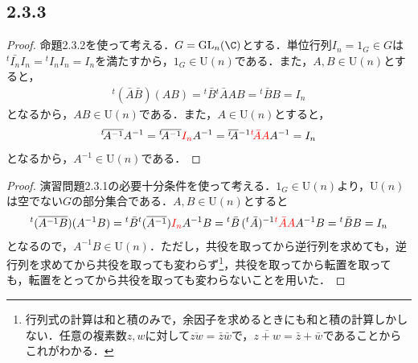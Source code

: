 \documentclass[uplatex,dvipdfmx,a4paper,11pt]{jsarticle}
\newenvironment{tleftbar}{\begin{tbleftline}\setlength{\parindent}{1zw}}{\end{tbleftline}}
\begin{document}
\subsection*{2.3.3}
\begin{tleftbar}
    \begin{proof}
        命題2.3.2を使って考える．$G=\mathrm{GL}_{n}(\C)$とする．単位行列$I_n=1_G\in G$は${}^t\bar{I_n}I_n={}^tI_nI_n=I_n$を満たすから，$1_G\in \mathrm{U}(n)$である．また，$A,B\in \mathrm{U}(n)$とすると，
        \begin{align*}
            {}^t(\bar{A}\bar{B})(AB)={}^t\bar{B}{}^t\!\bar{A}AB={}^t\bar{B}B=I_n
        \end{align*}
        となるから，$AB\in \mathrm{U}(n)$である．また，$A\in \mathrm{U}(n)$とすると，
        \begin{align*}
            {}^t\!\overline{A^{-1}}A^{-1}={}^t\!\overline{A^{-1}}\textcolor{red}{I_n}A^{-1}=\overline{{}^t\!A}{}^{-1}\textcolor{red}{{}^t\!\bar{A}A}A^{-1}=I_n
        \end{align*}
        となるから，$A^{-1}\in \mathrm{U}(n)$である．
    \end{proof}
    \begin{proof}
        演習問題2.3.1の必要十分条件を使って考える．$1_G\in \mathrm{U}(n)$より，$\mathrm{U}(n)$は空でない$G$の部分集合である．$A,B\in \mathrm{U}(n)$とすると
        \begin{align*}
            {}^t(\overline{A^{-1}B})(A^{-1}B)={}^t\bar{B}{}^t(\overline{A^{-1}})\textcolor{red}{I_n}A^{-1}B={}^t\bar{B}\,({}^t\bar{A}){}^{-1}\textcolor{red}{{}^t\bar{A}A}A^{-1}B={}^t\bar{B}B=I_n
        \end{align*}
        となるので，$A^{-1}B\in \mathrm{U}(n)$．ただし，共役を取ってから逆行列を求めても，逆行列を求めてから共役を取っても変わらず\footnote{行列式の計算は和と積のみで，余因子を求めるときにも和と積の計算しかしない．任意の複素数$z,w$に対して$\overline{zw}=\bar{z}\bar{w}$で，$\overline{z+w}=\bar{z}+\bar{w}$であることからこれがわかる．}，共役を取ってから転置を取っても，転置をとってから共役を取っても変わらないことを用いた．
    \end{proof}
\end{tleftbar}
\end{document}
